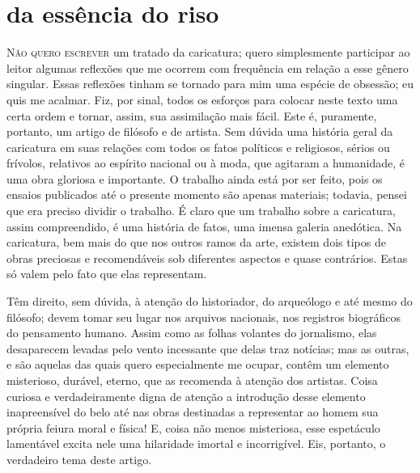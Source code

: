
\chapter[Da essência do riso]{da essência do riso}



\sectionitem

\noindent\textsc{Não quero escrever} um tratado da caricatura; quero simplesmente
participar ao leitor algumas reflexões que me ocorrem com frequência em
relação a esse gênero singular. Essas reflexões tinham se tornado para
mim uma espécie de obsessão; eu quis me acalmar. Fiz, por sinal, todos
os esforços para colocar neste texto uma certa ordem e tornar, assim,
sua assimilação mais fácil. Este é, puramente, portanto, um artigo de
filósofo e de artista. Sem dúvida uma história geral da caricatura em
suas relações com todos os fatos políticos e religiosos, sérios ou
frívolos, relativos ao espírito nacional ou à moda, que agitaram a
humanidade, é uma obra gloriosa e importante. O trabalho ainda está por
ser feito, pois os ensaios publicados até o presente momento são apenas
materiais; todavia, pensei que era preciso dividir o trabalho. É claro
que um trabalho sobre a caricatura, assim compreendido, é uma história
de fatos, uma imensa galeria anedótica. Na caricatura, bem mais do que
nos outros ramos da arte, existem dois tipos de obras preciosas e
recomendáveis sob diferentes aspectos e quase contrários. Estas só
valem pelo fato que elas representam.

Têm direito, sem dúvida, à atenção do historiador, do arqueólogo e até
mesmo do filósofo; devem tomar seu lugar nos arquivos nacionais, nos
registros biográficos do pensamento humano. Assim como as folhas
volantes do jornalismo, elas desaparecem levadas pelo vento incessante
que delas traz notícias; mas as outras, e são aquelas das quais quero
especialmente me ocupar, contêm um elemento misterioso, durável,
eterno, que as recomenda à atenção dos artistas. Coisa curiosa e
verdadeiramente digna de atenção a introdução desse elemento
inapreensível do belo até nas obras destinadas a representar ao homem
sua própria feiura moral e física! E, coisa não menos misteriosa, esse
espetáculo lamentável excita nele uma hilaridade imortal e
incorrigível. Eis, portanto, o verdadeiro tema deste artigo.

